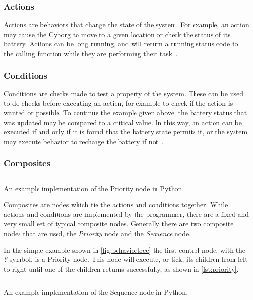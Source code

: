 \documentclass[\rootfolder/main.tex]{subfiles}
\begin{document}
\subsubsection{Actions}

Actions are behaviors that change the state of the system.
For example, an action may cause the Cyborg to move to a given location or check the status of its battery.
Actions can be long running, and will return a running status code to the calling function while they are performing their task~\cite{Millington2009}.

\subsubsection{Conditions}

Conditions are checks made to test a property of the system.
These can be used to do checks before executing an action, for example to check if the action is wanted or possible.
To continue the example given above, the battery status that was updated may be compared to a critical value.
In this way, an action can be executed if and only if it is found that the battery state permits it, or the system may execute behavior to recharge the battery if not~\cite{Millington2009}.

\subsubsection{Composites}

\begin{listing}
    \inputminted{python}{\rootfolder/Chapters/Chapter2/Listings/priority.py}
    \caption{An example implementation of the Priority node in Python.}
    \label{lst:priority}
\end{listing}

Composites are nodes which tie the actions and conditions together.
While actions and conditions are implemented by the programmer, there are a fixed and very small set of typical composite nodes.
Generally there are two composite nodes that are used, the \emph{Priority} node and the \emph{Sequence} node.

In the simple example shown in \cref{fig:behaviortree} the first control node, with the \emph{?} symbol, is a Priority node.
This node will execute, or tick, its children from left to right until one of the children returns successfully, as shown in \cref{lst:priority}.

\begin{listing}
    \inputminted{python}{\rootfolder/Chapters/Chapter2/Listings/sequence.py}
    \caption{An example implementation of the Sequence node in Python.}
    \label{lst:sequence}
\end{listing}
\end{document}
